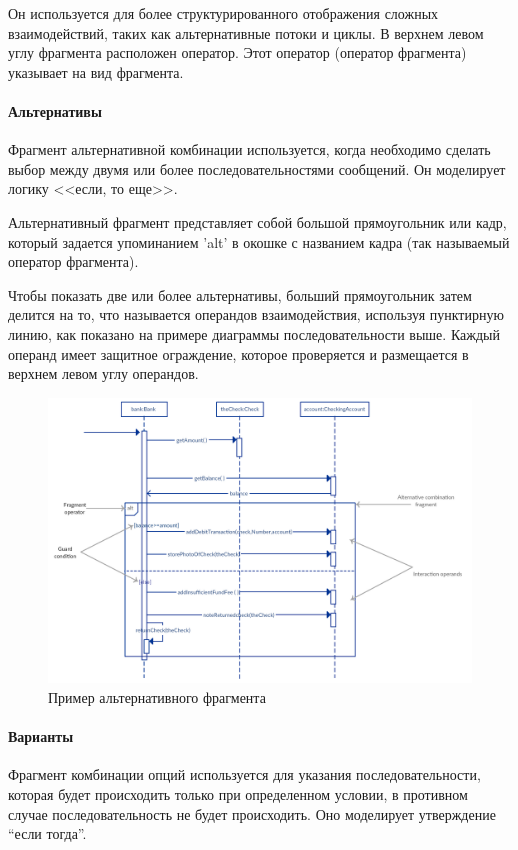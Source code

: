 \documentclass[a4paper,12pt]{report}
\begin{document}
Он используется для более структурированного отображения сложных взаимодействий, таких как альтернативные потоки и циклы. В верхнем левом углу фрагмента расположен оператор. Этот оператор (оператор фрагмента) указывает на вид фрагмента.
\paragraph{Альтернативы}

Фрагмент альтернативной комбинации используется, когда необходимо сделать выбор между двумя или более последовательностями сообщений. Он моделирует логику <<если, то еще>>.

Альтернативный фрагмент представляет собой большой прямоугольник или кадр, который задается упоминанием 'alt' в окошке с названием кадра (так называемый оператор фрагмента).

Чтобы показать две или более альтернативы, больший прямоугольник затем делится на то, что называется операндов взаимодействия, используя пунктирную линию, как показано на примере диаграммы последовательности выше. Каждый операнд имеет защитное ограждение, которое проверяется и размещается в верхнем левом углу операндов.

\begin{figure}[h!]
	\centering
	\includegraphics[width=0.6\linewidth]{images/framealt}
	\caption{Пример альтернативного фрагмента}
	\label{fig:framealt}
\end{figure}


\paragraph{Варианты}

Фрагмент комбинации опций используется для указания последовательности, которая будет происходить только при определенном условии, в противном случае последовательность не будет происходить. Оно моделирует утверждение “если тогда”.
\end{document}
